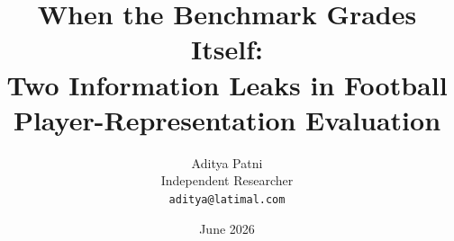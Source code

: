 %

\documentclass[11pt]{article}
\usepackage[margin=1in]{geometry}
\usepackage{graphicx}
\usepackage{booktabs}
\usepackage{amsmath}
\usepackage{amssymb}
\usepackage{url}
\usepackage[hidelinks]{hyperref}
\usepackage{microtype}
\usepackage{enumitem}

\title{When the Benchmark Grades Itself:\\
Two Information Leaks in Football\\ Player-Representation Evaluation}
\author{Aditya Patni\\ Independent Researcher\\ \texttt{aditya@latimal.com}}
\date{June 2026}


